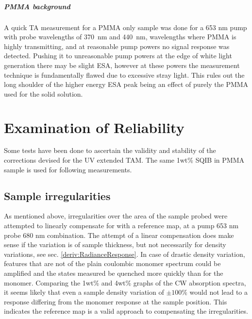 \documentclass[twoside,openright,listof=numbered]{scrreprt}
\begin{document}
\paragraph{PMMA background}
A quick TA measurement for a PMMA only sample was done for a 653 nm pump with probe wavelengths of \SI{370}{\nano\meter} and \SI{440}{\nano\meter},  wavelengths where PMMA is highly transmitting, and at reasonable pump powers no signal response was detected. Pushing it to unreasonable pump powers at the edge of white light generation there may be slight ESA, however at these powers the measurement technique is fundamentally flawed due to excessive stray light. This rules out the long shoulder of the higher energy ESA peak being an effect of purely the PMMA used for the solid solution.




\chapter{Examination of Reliability}\label{chpt:reliability}
Some tests have been done to ascertain the validity and stability of the corrections devised for the UV extended TAM. The same 1wt\% SQIB in PMMA sample is used for following measurements.
\section{Sample irregularities}
As mentioned above, irregularities over the area of the sample probed were attempted to linearly compensate for with a reference map, at a pump 653 nm probe 680 nm combination. The attempt of a linear compensation does make sense if the variation is of sample thickness, but not necessarily for density variations, see sec. \ref{deriv:RadianceResponse}. In case of drastic density variation, features that are not of the plain coulombic monomer spectrum could be amplified and the states measured be quenched more quickly than for the monomer. Comparing the 1wt\% and 4wt\% graphs of the CW absorption spectra, it seems likely that even a sample density variation of $\pm100\%$ would not lead to a response differing from the monomer response at the sample position. This indicates the reference map is a valid approach to compensating the irregularities.
\end{document}

